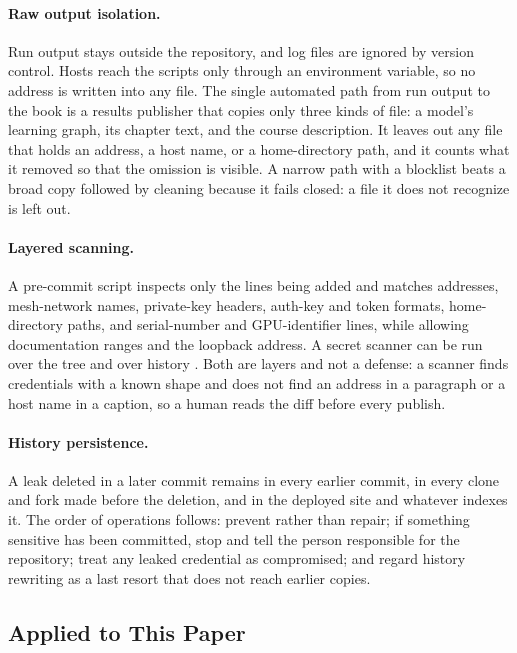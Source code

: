 \paragraph{Raw output isolation.}
Run output stays outside the repository, and log files are ignored by version control. Hosts reach the scripts only through an environment variable, so no address is written into any file. The single automated path from run output to the book is a results publisher that copies only three kinds of file: a model's learning graph, its chapter text, and the course description. It leaves out any file that holds an address, a host name, or a home-directory path, and it counts what it removed so that the omission is visible. A narrow path with a blocklist beats a broad copy followed by cleaning because it fails closed: a file it does not recognize is left out.

\paragraph{Layered scanning.}
A pre-commit script inspects only the lines being added and matches addresses, mesh-network names, private-key headers, auth-key and token formats, home-directory paths, and serial-number and GPU-identifier lines, while allowing documentation ranges and the loopback address. A secret scanner can be run over the tree and over history \cite{gitleaks}. Both are layers and not a defense: a scanner finds credentials with a known shape and does not find an address in a paragraph or a host name in a caption, so a human reads the diff before every publish.

\paragraph{History persistence.}
A leak deleted in a later commit remains in every earlier commit, in every clone and fork made before the deletion, and in the deployed site and whatever indexes it. The order of operations follows: prevent rather than repair; if something sensitive has been committed, stop and tell the person responsible for the repository; treat any leaked credential as compromised; and regard history rewriting as a last resort that does not reach earlier copies.

\subsection{Applied to This Paper}


